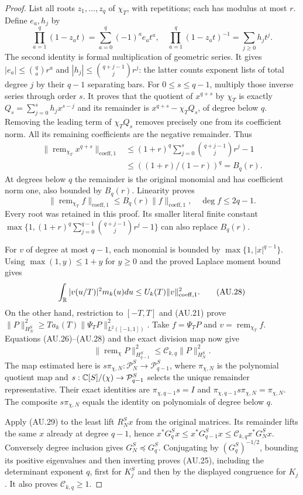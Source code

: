 \begin{proof}
List all roots $z_1,\ldots,z_q$ of $\chi_T$, with repetitions;
each has modulus at most $r$. Define $e_a,h_j$ by
\[
 \prod_{a=1}^q(1-z_at)=\sum_{a=0}^q(-1)^ae_at^a,
 \quad
 \prod_{a=1}^q(1-z_at)^{-1}=\sum_{j\ge0}h_jt^j.
\]
The second identity is formal multiplication of geometric series.
It gives $|e_a|\le\binom qa r^a$ and
$|h_j|\le\binom{q+j-1}{j}r^j$: the latter counts exponent lists
of total degree $j$ by their $q-1$ separating bars.
For $0\le s\le q-1$, multiply those inverse series through order $s$.
It proves that the quotient of $x^{q+s}$ by $\chi_T$ is exactly
$Q_s=\sum_{j=0}^sh_jx^{s-j}$ and its remainder is
$x^{q+s}-\chi_TQ_s$, of degree below $q$.
Removing the leading term of $\chi_TQ_s$ removes precisely one
from its coefficient norm. All its remaining coefficients are the
negative remainder. Thus
\[
 \begin{split}
 \|\operatorname{rem}_{\chi_T}x^{q+s}\|_{\mathrm{coeff},1}
 &\le(1+r)^q\sum_{j=0}^s\binom{q+j-1}{j}r^j-1\\
 &\le((1+r)/(1-r))^q=B_q(r).
 \end{split}
\]
At degrees below $q$ the remainder is the original monomial and has
coefficient norm one, also bounded by $B_q(r)$. Linearity proves
\[
 \|\operatorname{rem}_{\chi_T}f\|_{\mathrm{coeff},1}
 \le B_q(r)\|f\|_{\mathrm{coeff},1},\quad\deg f\le2q-1.
 \tag{AU.27}
\]
Every root was retained in this proof. Its smaller literal finite
constant $\max\{1,(1+r)^q\sum_{j=0}^{q-1}\binom{q+j-1}{j}r^j-1\}$
can also replace $B_q(r)$.

For $v$ of degree at most $q-1$, each monomial is bounded by
$\max\{1,|x|^{q-1}\}$. Using $\max(1,y)\le1+y$ for $y\ge0$
and the proved Laplace moment bound gives
\[
 \int_{\mathbb{R}}|v(u/T)|^2m_k(u)du
             \le U_k(T)\|v\|_{\mathrm{coeff},1}^2.        \tag{AU.28}
\]
On the other hand, restriction to $[-T,T]$ and (AU.21) prove
$\|P\|_{H_N^S}^2\ge T a_k(T)\|\Psi_TP\|_{L^2([-1,1])}^2$.
Take $f=\Psi_TP$ and $v=\operatorname{rem}_{\chi_T}f$.
Equations (AU.26)--(AU.28) and the exact division map now give
\[
 \|\operatorname{rem}_\chi P\|_{H_{q-1}^S}^2
                      \le\mathcal C_{k,q}\|P\|_{H_N^S}^2.
 \tag{AU.29}
\]
The map estimated here is $s\pi_{\chi,N}:\mathcal P_N^S\to
\mathcal P_{q-1}^S$, where $\pi_{\chi,N}$ is the polynomial quotient
map and $s:\mathbb{C}[S]/(\chi)\to\mathcal P_{q-1}^S$ selects the unique
remainder representative. Their exact identities are
$\pi_{\chi,q-1}s=I$ and
$\pi_{\chi,q-1}s\pi_{\chi,N}=\pi_{\chi,N}$.
The composite $s\pi_{\chi,N}$ equals the identity on polynomials
of degree below $q$.

Apply (AU.29) to the least lift $R_N^Sx$ from the original matrices.
Its remainder lifts the same
$x$ already at degree $q-1$, hence
$x^*G_q^Sx\le x^*G_{q-1}^Sx
\le\mathcal C_{k,q}x^*G_N^Sx$. Conversely degree inclusion gives
$G_N^S\preceq G_q^S$. Conjugating by $(G_q^S)^{-1/2}$, bounding its positive
eigenvalues and then inverting proves (AU.25), including the
determinant exponent $q$, first for $K_j^S$ and then by the displayed
congruence for $K_j$. It also proves $\mathcal C_{k,q}\ge1$.
\end{proof}

